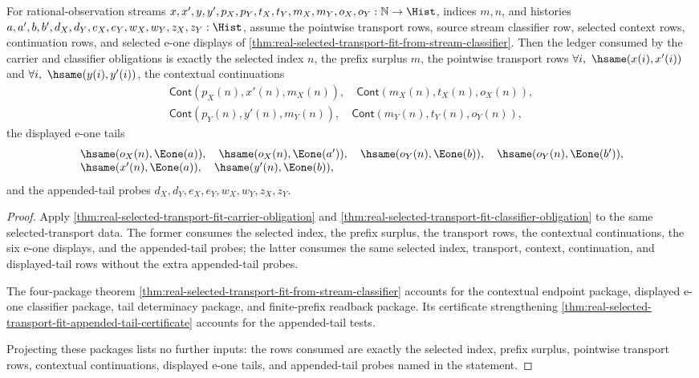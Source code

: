 \begin{theorem}
\label{thm:real-selected-transport-fit-ledger-obligation}
For rational-observation streams
$x,x',y,y',p_X,p_Y,t_X,t_Y,m_X,m_Y,o_X,o_Y:\mathbb{N}\to\Hist$,
indices $m,n$, and histories
$a,a',b,b',d_X,d_Y,e_X,e_Y,w_X,w_Y,z_X,z_Y:\Hist$, assume the pointwise
transport rows, source stream classifier row, selected context rows,
continuation rows, and selected e-one displays of
\autoref{thm:real-selected-transport-fit-from-stream-classifier}. Then the
ledger consumed by the carrier and classifier obligations is exactly the
selected index $n$, the prefix surplus $m$, the pointwise transport rows
$\forall i,\ \hsame(x(i),x'(i))$ and
$\forall i,\ \hsame(y(i),y'(i))$, the contextual continuations
$$
\begin{array}{l}
\mathsf{Cont}(p_X(n),x'(n),m_X(n)),\quad
\mathsf{Cont}(m_X(n),t_X(n),o_X(n)),\\
\mathsf{Cont}(p_Y(n),y'(n),m_Y(n)),\quad
\mathsf{Cont}(m_Y(n),t_Y(n),o_Y(n)),
\end{array}
$$
the displayed e-one tails
$$
\begin{array}{l}
\hsame(o_X(n),\Eone(a)),\quad
\hsame(o_X(n),\Eone(a')),\quad
\hsame(o_Y(n),\Eone(b)),\quad
\hsame(o_Y(n),\Eone(b')),\\
\hsame(x'(n),\Eone(a)),\quad
\hsame(y'(n),\Eone(b)),
\end{array}
$$
and the appended-tail probes $d_X,d_Y,e_X,e_Y,w_X,w_Y,z_X,z_Y$.
\end{theorem}
\begin{proof}
Apply
\autoref{thm:real-selected-transport-fit-carrier-obligation} and
\autoref{thm:real-selected-transport-fit-classifier-obligation} to the same
selected-transport data. The former consumes the selected index, the prefix
surplus, the transport rows, the contextual continuations, the six e-one
displays, and the appended-tail probes; the latter consumes the same selected
index, transport, context, continuation, and displayed-tail rows without the
extra appended-tail probes.

The four-package theorem
\autoref{thm:real-selected-transport-fit-from-stream-classifier} accounts for
the contextual endpoint package, displayed e-one classifier package, tail
determinacy package, and finite-prefix readback package. Its certificate
strengthening
\autoref{thm:real-selected-transport-fit-appended-tail-certificate} accounts
for the appended-tail tests.

Projecting these packages lists no further inputs: the rows consumed are
exactly the selected index, prefix surplus, pointwise transport rows,
contextual continuations, displayed e-one tails, and appended-tail probes named
in the statement.
\end{proof}

